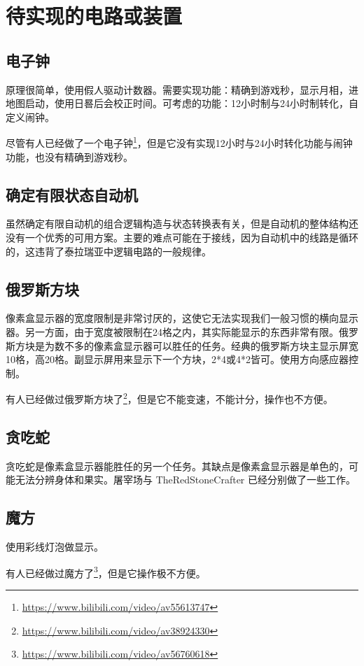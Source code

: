 \chapter{待实现的电路或装置}

\section{电子钟}
原理很简单，使用假人驱动计数器。需要实现功能：精确到游戏秒，显示月相，进地图启动，使用日晷后会校正时间。可考虑的功能：12小时制与24小时制转化，自定义闹钟。

尽管有人已经做了一个电子钟\footnote{\url{https://www.bilibili.com/video/av55613747}}，但是它没有实现12小时与24小时转化功能与闹钟功能，也没有精确到游戏秒。

\section{确定有限状态自动机}
虽然确定有限自动机的组合逻辑构造与状态转换表有关，但是自动机的整体结构还没有一个优秀的可用方案。主要的难点可能在于接线，因为自动机中的线路是循环的，这违背了泰拉瑞亚中逻辑电路的一般规律。

\section{俄罗斯方块}
像素盒显示器的宽度限制是非常讨厌的，这使它无法实现我们一般习惯的横向显示器。另一方面，由于宽度被限制在24格之内，其实际能显示的东西非常有限。俄罗斯方块是为数不多的像素盒显示器可以胜任的任务。经典的俄罗斯方块主显示屏宽10格，高20格。副显示屏用来显示下一个方块，2*4或4*2皆可。使用方向感应器控制。

有人已经做过俄罗斯方块了\footnote{\url{https://www.bilibili.com/video/av38924330}}，但是它不能变速，不能计分，操作也不方便。

\section{贪吃蛇}
贪吃蛇是像素盒显示器能胜任的另一个任务。其缺点是像素盒显示器是单色的，可能无法分辨身体和果实。屠宰场与 TheRedStoneCrafter 已经分别做了一些工作。

\section{魔方}
使用彩线灯泡做显示。

有人已经做过魔方了\footnote{\url{https://www.bilibili.com/video/av56760618}}，但是它操作极不方便。

